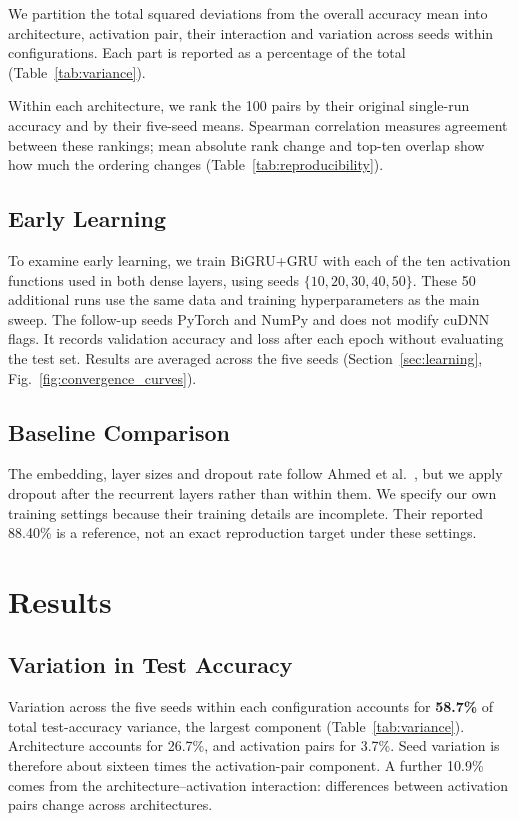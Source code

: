 \documentclass[conference,a4paper]{IEEEtran}
\begin{document}
We partition the total squared deviations from the overall
accuracy mean into architecture, activation pair, their
interaction and variation across seeds within configurations.
Each part is reported as a percentage of the total
(Table~\ref{tab:variance}).

Within each architecture, we rank the 100 pairs by their
original single-run accuracy and by their five-seed means.
Spearman correlation measures agreement between these rankings;
mean absolute rank change and top-ten overlap show how much
the ordering changes (Table~\ref{tab:reproducibility}).

\subsection{Early Learning}
\label{sec:convergence_protocol}

To examine early learning, we train BiGRU+GRU with each of
the ten activation functions used in both dense layers,
using seeds $\{10,20,30,40,50\}$. These 50 additional runs
use the same data and training hyperparameters as the main
sweep. The follow-up seeds PyTorch and NumPy and does not
modify cuDNN flags. It records validation accuracy and loss
after each epoch without evaluating the test set.
Results are averaged across the five seeds
(Section~\ref{sec:learning}, Fig.~\ref{fig:convergence_curves}).

\subsection{Baseline Comparison}
\label{sec:baseline_repro}

The embedding, layer sizes and dropout rate follow
Ahmed et al.~\cite{ahmed2025}, but we apply dropout after
the recurrent layers rather than within them. We specify
our own training settings because their training details
are incomplete. Their reported 88.40\% is a reference,
not an exact reproduction target under these settings.

\FloatBarrier
\section{Results}
\label{sec:results}

\subsection{Variation in Test Accuracy}
\label{sec:variance}

Variation across the five seeds within each configuration
accounts for \textbf{58.7\%} of total test-accuracy variance,
the largest component (Table~\ref{tab:variance}). Architecture
accounts for 26.7\%, and activation pairs for 3.7\%. Seed
variation is therefore about sixteen times the activation-pair
component. A further 10.9\% comes from the architecture--activation
interaction: differences between activation pairs change
across architectures.
\end{document}
